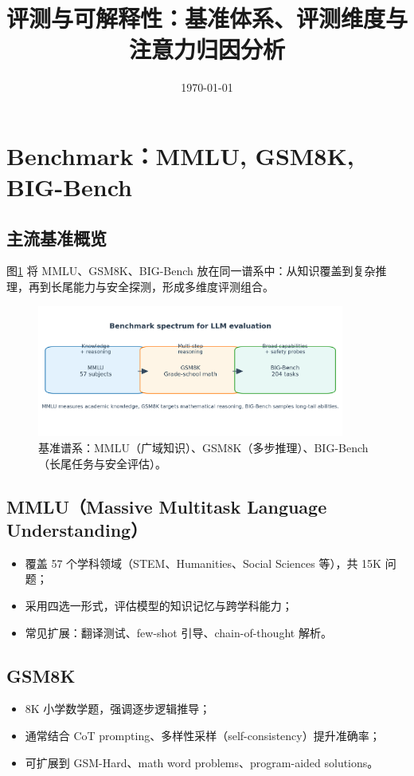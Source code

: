 \documentclass[UTF8,zihao=-4]{ctexart}
\title{评测与可解释性：基准体系、评测维度与注意力归因分析}
\author{}
\date{\today}
\begin{document}
\maketitle

\section{Benchmark：MMLU, GSM8K, BIG-Bench}
\subsection{主流基准概览}
图\ref{fig:benchmark_landscape_cn} 将 MMLU、GSM8K、BIG-Bench 放在同一谱系中：从知识覆盖到复杂推理，再到长尾能力与安全探测，形成多维度评测组合。
\begin{figure}[H]
  \centering
  \includegraphics[width=0.9\textwidth]{benchmark_landscape.png}
  \caption{基准谱系：MMLU（广域知识）、GSM8K（多步推理）、BIG-Bench（长尾任务与安全评估）。}
  \label{fig:benchmark_landscape_cn}
\end{figure}

\subsection{MMLU（Massive Multitask Language Understanding）}
\begin{itemize}
  \item 覆盖 57 个学科领域（STEM、Humanities、Social Sciences 等），共 15K 问题；
  \item 采用四选一形式，评估模型的知识记忆与跨学科能力；
  \item 常见扩展：翻译测试、few-shot 引导、chain-of-thought 解析。
\end{itemize}

\subsection{GSM8K}
\begin{itemize}
  \item 8K 小学数学题，强调逐步逻辑推导；
  \item 通常结合 CoT prompting、多样性采样（self-consistency）提升准确率；
  \item 可扩展到 GSM-Hard、math word problems、program-aided solutions。
\end{itemize}
\end{document}
